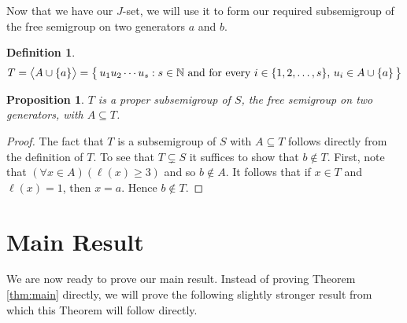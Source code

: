 \documentclass[12pt]{article}
\theoremstyle{plain}
\newtheorem{prop}[thm]{Proposition}
\theoremstyle{definition}
\newtheorem{defn}[thm]{Definition}
\newcommand{\la}{\langle}
\newcommand{\ra}{\rangle}
\begin{document}
Now that we have our $J$-set, we will use it to form our 
required subsemigroup of the free semigroup on two generators 
$a$ and $b$.

  \begin{defn}\label{subsgrp}
  \[
  T = \bigl\la A \cup \{a\} \bigr\ra = \bigl\{\,u_1u_2 \cdots u_s : 
  \hbox{$s \in \mathbb{N}$ and for every $i \in \{1, 2, \ldots, s\}$,
  $u_i \in A \cup \{a\}$}\,\bigr\}
  \]
  \end{defn}

  \begin{prop}\label{prop:subsgrp}
  $T$ is a proper subsemigroup of $S$, the free semigroup on two 
  generators, with $A \subseteq T$.
  \end{prop}
  \begin{proof}
  The fact that $T$ is a subsemigroup of $S$ with $A \subseteq T$
  follows directly from the definition of $T$.
  To see that $T \subsetneq S$ it suffices to show that $b \not\in
  T$.
  First, note that $(\forall x \in A)(\ell(x) \ge 3)$ and so
  $b \not\in A$.
  It follows that if $x \in T$ and $\ell(x) = 1$, then $x=a$. 
  Hence $b \not\in T$.
  \end{proof}

\section{Main Result}
We are now ready to prove our main result.
Instead of proving Theorem \ref{thm:main} directly, we will
prove the following slightly stronger result from which this  
Theorem will follow directly.
\end{document}
